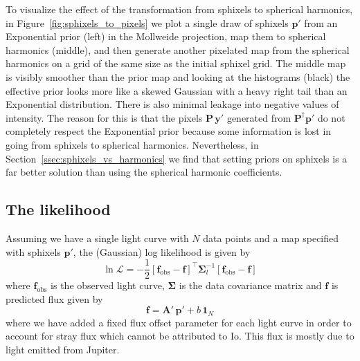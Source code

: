 \documentclass[modern]{aastex62}
\begin{document}
To visualize the effect of the transformation from sphixels to spherical harmonics, in Figure~\ref{fig:sphixels_to_pixels} we plot a single draw of sphixels $\mathbf{p}'$ from an Exponential prior (left) in the Mollweide projection, map them to spherical harmonics (middle), and then generate another pixelated map from the spherical harmonics on a grid of the same size as the initial sphixel grid.
The middle map is visibly smoother than the prior map and looking at the histograms (black) the effective prior looks more like a skewed Gaussian with a heavy right tail than an Exponential distribution.
There is also minimal leakage into negative values of intensity.
The reason for this is that the pixels $\mathbf{P}\,\mathbf{y}'$ generated from $\mathbf{P}^\dagger\mathbf{p}'$ do not completely respect the Exponential prior because some information is lost in going from sphixels to spherical harmonics.
Nevertheless, in Section~\ref{ssec:sphixels_vs_harmonics} we find that setting priors on sphixels is a far better solution than using the spherical harmonic coefficients.

\subsection{The likelihood}
\label{ssec:likelihood}
Assuming we have a single light curve with $N$ data points and a map specified with sphixels $\mathbf{p}'$, the (Gaussian) log likelihood is given by
\begin{equation}
    \ln\mathcal{L}=-\frac{1}{2}\left[\mathbf{f}_\mathrm{obs}-\mathbf{f} \right]^{\top}
    \boldsymbol{\Sigma}_l^{-1}\left[\mathbf{f}_\mathrm{obs}-\mathbf{f} \right]
    \label{eq:likelihood}
\end{equation}
where $\mathbf{f}_\mathrm{obs}$ is the observed light curve, $\boldsymbol{\Sigma}$ is the data covariance matrix and $\mathbf{f}$ is predicted flux given by
\begin{equation}
    \mathbf{f}=\mathbf{A}'\,\mathbf{p}' +b\,\mathbf{1}_N
    \label{eq:flux_model}
\end{equation}
where we have added a fixed flux offset parameter for each light curve in order to account for stray flux which cannot be attributed to Io.
This flux is mostly due to light emitted from Jupiter.
\end{document}
